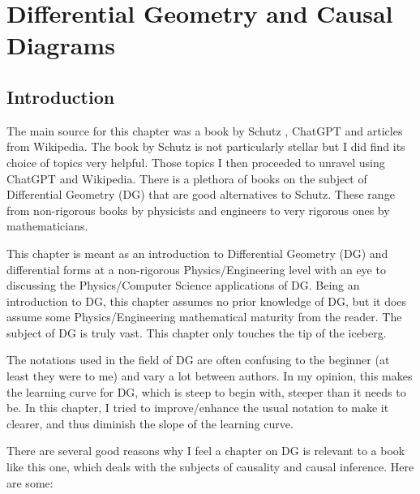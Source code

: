 \chapter{Differential Geometry
and Causal Diagrams}
\label{ch-differ-geo}

\section{Introduction}

The main source for this chapter was a book by Schutz \cite{schutz}, ChatGPT and articles from Wikipedia.
The book by Schutz is not particularly stellar but
I did find its choice of topics very helpful. Those topics I then proceeded to unravel using ChatGPT and Wikipedia. 
There is a plethora of books on the subject
of Differential Geometry (DG) that are good alternatives  to Schutz. These
range from 
non-rigorous books
by physicists and engineers 
to very rigorous ones by mathematicians. 


This chapter is meant
as an introduction
to
Differential Geometry  (DG) and
differential forms at a non-rigorous
Physics/Engineering level
with an eye to
discussing the Physics/Computer Science
applications of DG.
Being an introduction to DG,
this chapter assumes no
prior knowledge of DG, but it does
assume some 
Physics/Engineering mathematical maturity from the reader.
The subject of DG is 
truly vast. This chapter only touches the tip of the iceberg.

The notations used in the
field of DG are 
often confusing
to the beginner
(at least they were to me)
and vary a lot between authors.
In my opinion, this makes the learning curve for DG, which is steep
to begin with, steeper than it needs to be. 
In this chapter,
I tried to improve/enhance the 
usual notation
to make it clearer, and thus 
diminish the slope of the learning curve.

There are several good reasons why
I feel a chapter
on DG is
relevant to a book like this one,
which deals with
the subjects of
causality and causal inference.
Here are some:

